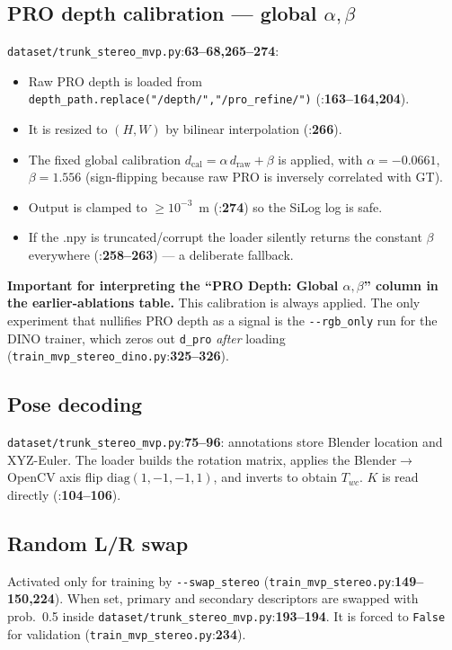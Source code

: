 \documentclass[11pt]{article}
\newcommand{\fref}[2]{\texttt{\textcolor{filegray}{#1}}:\textbf{#2}}
\begin{document}
\subsection{PRO depth calibration --- global $\alpha,\beta$}
\fref{dataset/trunk\_stereo\_mvp.py}{63--68,265--274}:

\begin{itemize}[leftmargin=2em]
  \item Raw PRO depth is loaded from
        \texttt{depth\_path.replace("/depth/","/pro\_refine/")}
        (\fref{}{163--164,204}).
  \item It is resized to $(H,W)$ by bilinear interpolation
        (\fref{}{266}).
  \item The fixed global calibration
        $d_{\text{cal}} = \alpha\, d_{\text{raw}} + \beta$ is applied,
        with $\alpha = -0.0661$, $\beta = 1.556$
        (sign-flipping because raw PRO is inversely correlated with GT).
  \item Output is clamped to $\geq 10^{-3}$~m
        (\fref{}{274}) so the SiLog log is safe.
  \item If the .npy is truncated/corrupt the loader silently returns
        the constant $\beta$ everywhere
        (\fref{}{258--263}) --- a deliberate fallback.
\end{itemize}

\textbf{Important for interpreting the ``PRO Depth: Global $\alpha,\beta$''
column in the earlier-ablations table.} This calibration is always
applied. The only experiment that nullifies PRO depth as a signal is the
\texttt{-{}-rgb\_only} run for the DINO trainer, which zeros out
\texttt{d\_pro} \emph{after} loading
(\fref{train\_mvp\_stereo\_dino.py}{325--326}).

\subsection{Pose decoding}
\fref{dataset/trunk\_stereo\_mvp.py}{75--96}: annotations store Blender
location and XYZ-Euler. The loader builds the rotation matrix, applies
the Blender$\to$OpenCV axis flip $\mathrm{diag}(1,-1,-1,1)$, and inverts
to obtain $T_{wc}$. $K$ is read directly
(\fref{}{104--106}).

\subsection{Random L/R swap}
Activated only for training by \texttt{-{}-swap\_stereo}
(\fref{train\_mvp\_stereo.py}{149--150,224}). When set, primary and
secondary descriptors are swapped with prob.\ 0.5 inside
\fref{dataset/trunk\_stereo\_mvp.py}{193--194}. It is forced to
\texttt{False} for validation
(\fref{train\_mvp\_stereo.py}{234}).
\end{document}
